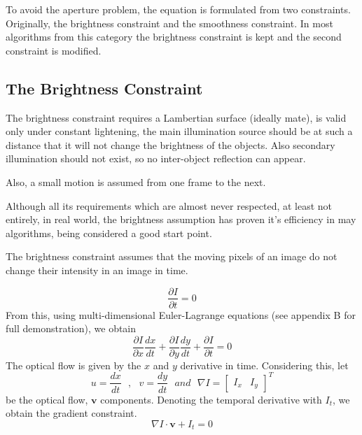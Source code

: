 \documentclass[12pt,a4paper,twoside]{report}
\begin{document}
{To avoid the aperture problem, the equation is formulated from two constraints. Originally, the brightness constraint and the smoothness constraint. In most algorithms from this category the brightness constraint is kept and the second constraint is modified.
\subsection{The Brightness Constraint} \label{BrightnessConstr}

The brightness constraint requires a Lambertian surface (ideally mate), is valid only under constant lightening, the main illumination source should be at such a distance that it will not change the brightness of the objects. Also secondary illumination should not exist, so no inter-object reflection can appear.

 Also, a small motion is assumed from one frame to the next. 
 
Although all its  requirements which are almost never respected, at least not entirely, in real world, the brightness assumption has proven it's efficiency in may algorithms, being considered a good start point.

The brightness constraint assumes that the moving pixels of an image do not change their intensity in an image in time.


\begin{equation}  \label{Idt0}
\frac{\partial I}{\partial t} = 0
\end{equation}
From this, using multi-dimensional Euler-Lagrange equations (see appendix B for full demonstration), we obtain
\begin{equation} \label{Idt0_lagr}
\frac{\partial I}{\partial x}\frac{dx}{dt} +
\frac{\partial I}{\partial y}\frac{dy}{dt} +
\frac{\partial I}{\partial t} = 0
\end{equation}
The optical flow is given by the $x$ and $y$ derivative in time. Considering this, let
\begin{equation}
u = \frac{dx}{dt} \ \ \ , \ \ \  v = \frac{dy}{dt} \ \ \ and \ \ \ \nabla I=\begin{bmatrix}
I_x & I_y
\end{bmatrix} ^T
\end{equation} 
be the optical flow, $\boldsymbol{v}$ components. Denoting the temporal derivative with $I_t$, we obtain the gradient constraint. 
\begin{equation}
	\nabla I \cdot \boldsymbol{v}+I_t = 0
\end{equation}


}
\end{document}
